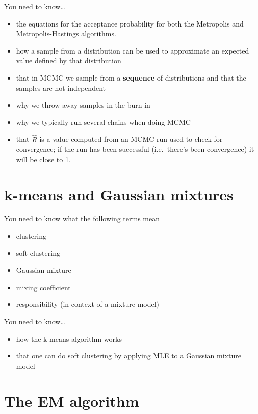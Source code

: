 \documentclass{article}
\newcommand{\yntk}{You need to know}
\begin{document}
\yntk \dots
\begin{itemize}
\item the equations for the acceptance probability for both the
  Metropolis and Metropolis-Hastings algorithms.
\item how a sample from a distribution can be used to approximate an
  expected value defined by that distribution
\item that in MCMC we sample from a \textbf{sequence} of distributions
  and that the samples are not independent
\item why we throw away samples in the burn-in
\item why we typically run several chains when doing MCMC
\item that $\hat{R}$ is a value computed from an MCMC run used to
  check for convergence; if the run has been successful (i.e.\ there's
  been convergence) it will be close to 1.
\end{itemize}

\section{k-means and Gaussian mixtures}
\label{sec:kmeansetc}

\yntk{} what the following terms mean
\begin{itemize}
\item clustering
\item soft clustering
\item Gaussian mixture
\item mixing coefficient
\item responsibility (in context of a mixture model)
\end{itemize}

\yntk \dots
\begin{itemize}
\item how the k-means algorithm works
\item that one can do soft clustering by applying MLE to a Gaussian
  mixture model
\end{itemize}

\section{The EM algorithm}
\label{sec:em}
\end{document}

